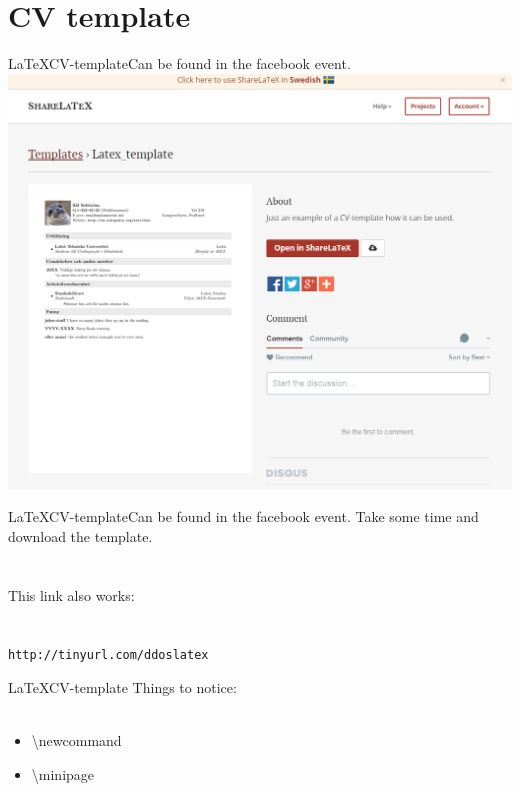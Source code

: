 \section{CV template}
\newcommand{\where}{in the facebook event.}
\begin{frame}{\LaTeX CV-template}{Can be found \where}
    \includegraphics[width=\textwidth]{img/2-cvlatex.png}
\end{frame}

\begin{frame}{\LaTeX CV-template}{Can be found \where}
    Take some time and download the template. \\ \ \\ \ \\
    \small This link also works: \\ \ \\ \ \\
    \normalsize
    \texttt{http://tinyurl.com/ddoslatex}
\end{frame}

\begin{frame}{\LaTeX CV-template}
	Things to notice: \\ \ 
	\begin{itemize}
	\item \textbackslash newcommand
	\item \textbackslash minipage
	\end{itemize} 
\end{frame}

